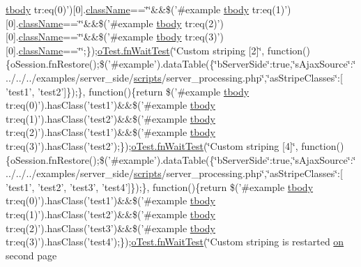 \begin{DoxyCompactItemize}
\hyperlink{core_8constructor_8js_a99b0542c7c50fe8757c55bf9dac5f3be}{tbody} tr\+:eq(0)')\mbox{[}0\mbox{]}.\hyperlink{validate_8js_abbe788cfd8330266bd93d69ea395d1d0}{class\+Name}==\char`\"{}\char`\"{}\&\&\$('\#example \hyperlink{core_8constructor_8js_a99b0542c7c50fe8757c55bf9dac5f3be}{tbody} tr\+:eq(1)')\mbox{[}0\mbox{]}.\hyperlink{validate_8js_abbe788cfd8330266bd93d69ea395d1d0}{class\+Name}==\char`\"{}\char`\"{}\&\&\$('\#example \hyperlink{core_8constructor_8js_a99b0542c7c50fe8757c55bf9dac5f3be}{tbody} tr\+:eq(2)')\mbox{[}0\mbox{]}.\hyperlink{validate_8js_abbe788cfd8330266bd93d69ea395d1d0}{class\+Name}==\char`\"{}\char`\"{}\&\&\$('\#example \hyperlink{core_8constructor_8js_a99b0542c7c50fe8757c55bf9dac5f3be}{tbody} tr\+:eq(3)')\mbox{[}0\mbox{]}.\hyperlink{validate_8js_abbe788cfd8330266bd93d69ea395d1d0}{class\+Name}==\char`\"{}\char`\"{};\});\hyperlink{onhold_24__server-side_2__zero__config_8js_ab25c4d596771c0133cdc45178ce72c3d}{o\+Test.\+fn\+Wait\+Test}(\char`\"{}Custom striping \mbox{[}2\mbox{]}\char`\"{}, function()\{o\+Session.\+fn\+Restore();\$('\#example').data\+Table(\{\char`\"{}b\+Server\+Side\char`\"{}\+:true,\char`\"{}s\+Ajax\+Source\char`\"{}\+:\char`\"{}../../../examples/server\+\_\+side/\hyperlink{tinymce_8jquery_8dev_8js_a09066d4d580eeec222f858d588b4cdef}{scripts}/server\+\_\+processing.\+php\char`\"{},\char`\"{}as\+Stripe\+Classes\char`\"{}\+:\mbox{[} 'test1', 'test2'\mbox{]}\});\}, function()\{return \$('\#example \hyperlink{core_8constructor_8js_a99b0542c7c50fe8757c55bf9dac5f3be}{tbody} tr\+:eq(0)').has\+Class('test1')\&\&\$('\#example \hyperlink{core_8constructor_8js_a99b0542c7c50fe8757c55bf9dac5f3be}{tbody} tr\+:eq(1)').has\+Class('test2')\&\&\$('\#example \hyperlink{core_8constructor_8js_a99b0542c7c50fe8757c55bf9dac5f3be}{tbody} tr\+:eq(2)').has\+Class('test1')\&\&\$('\#example \hyperlink{core_8constructor_8js_a99b0542c7c50fe8757c55bf9dac5f3be}{tbody} tr\+:eq(3)').has\+Class('test2');\});\hyperlink{onhold_24__server-side_2__zero__config_8js_ab25c4d596771c0133cdc45178ce72c3d}{o\+Test.\+fn\+Wait\+Test}(\char`\"{}Custom striping \mbox{[}4\mbox{]}\char`\"{}, function()\{o\+Session.\+fn\+Restore();\$('\#example').data\+Table(\{\char`\"{}b\+Server\+Side\char`\"{}\+:true,\char`\"{}s\+Ajax\+Source\char`\"{}\+:\char`\"{}../../../examples/server\+\_\+side/\hyperlink{tinymce_8jquery_8dev_8js_a09066d4d580eeec222f858d588b4cdef}{scripts}/server\+\_\+processing.\+php\char`\"{},\char`\"{}as\+Stripe\+Classes\char`\"{}\+:\mbox{[} 'test1', 'test2', 'test3', 'test4'\mbox{]}\});\}, function()\{return \$('\#example \hyperlink{core_8constructor_8js_a99b0542c7c50fe8757c55bf9dac5f3be}{tbody} tr\+:eq(0)').has\+Class('test1')\&\&\$('\#example \hyperlink{core_8constructor_8js_a99b0542c7c50fe8757c55bf9dac5f3be}{tbody} tr\+:eq(1)').has\+Class('test2')\&\&\$('\#example \hyperlink{core_8constructor_8js_a99b0542c7c50fe8757c55bf9dac5f3be}{tbody} tr\+:eq(2)').has\+Class('test3')\&\&\$('\#example \hyperlink{core_8constructor_8js_a99b0542c7c50fe8757c55bf9dac5f3be}{tbody} tr\+:eq(3)').has\+Class('test4');\});\hyperlink{onhold_24__server-side_2__zero__config_8js_ab25c4d596771c0133cdc45178ce72c3d}{o\+Test.\+fn\+Wait\+Test}(\char`\"{}Custom striping is restarted \hyperlink{fullpage_2plugin_8min_8js_a1cfa98b7fed2aaf9fee3b68dbb7f9497}{on} second page 
\end{DoxyCompactItemize}
